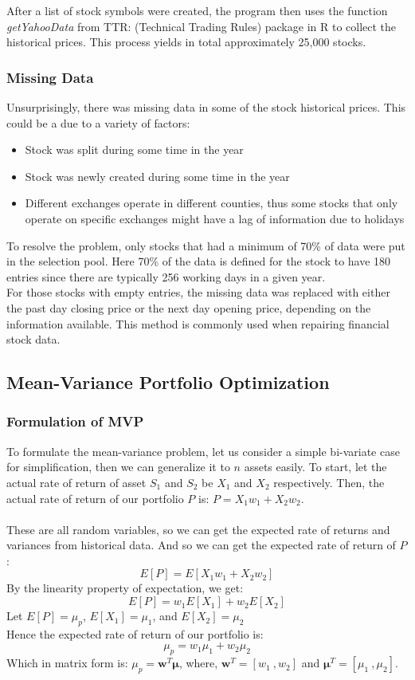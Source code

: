 \documentclass[12pt,titlepage,letter]{article}
\begin{document}
			After a list of stock symbols were created, the program then uses the function \textit{getYahooData} from TTR: (Technical Trading Rules) package in R to collect the historical prices. This process yields in total approximately 25,000 stocks. 
		
		\subsubsection{Missing Data}
			Unsurprisingly, there was missing data in some of the stock historical prices. This could be a due to a variety of factors: 
			\begin{itemize}
				\item Stock was split during some time in the year
				\item Stock was newly created during some time in the year
				\item Different exchanges operate in different counties, thus some stocks that only operate on specific exchanges might have a lag of information due to holidays
			\end{itemize}

			To resolve the problem, only stocks that had a minimum of 70\% of data were put in the selection pool. Here 70\% of the data is defined for the stock to have 180 entries since there are typically 256 working days in a given year.\\

			For those stocks with empty entries, the missing data was replaced with either the past day closing price or the next day opening price, depending on the information available. This method is commonly used when repairing financial stock data.  

	\subsection{Mean-Variance Portfolio Optimization}
		\subsubsection{Formulation of MVP}
			To formulate the mean-variance problem, let us consider a simple bi-variate case for simplification, then we can generalize it to $n$ assets easily. To start, let the actual rate of return of asset $S_1$ and $S_2$ be $X_1$ and $X_2$ respectively. Then, the actual rate of return of our portfolio $P$ is: $P = X_1w_1 + X_2w_2$.\\
			\\
			These are all random variables, so we can get the expected rate of returns and variances from historical data. And so we can get the expected rate of return of $P$: 
			$$
				E[P] = E[X_1w_1 + X_2w_2]
			$$
			By the linearity property of expectation, we get: 
			$$
				E[P] = w_1E[X_1] + w_2E[X_2]
			$$
			Let $E[P] = \mu_p$, $E[X_1] = \mu_1$, and $E[X_2]=\mu_2$ \\
			Hence the expected rate of return of our portfolio is: 
			$$
				\mu_p = w_1 \mu_1 + w_2 \mu_2
			$$
			Which in matrix form is: $\mu_p = \mathbf{w}^T\pmb{\mu}$, where,  $\mathbf{w}^T = [ w_1\ ,  w_2 ]$ and  $\pmb{\mu}^T = [ \mu_1\ , \mu_2 ]$. \\
\end{document}
